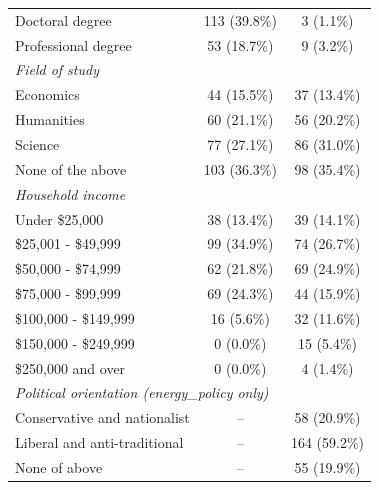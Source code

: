 \begin{table}[htbp]
\begin{tabular*}{0.75\textwidth}{@{\extracolsep{\fill}} l c c}
        \quad Doctoral degree                & 113 (39.8\%)   & 3 (1.1\%)      \\
        \quad Professional degree            & 53 (18.7\%)    & 9 (3.2\%)      \\
        \multicolumn{3}{l}{\textit{Field of study}} \\
        \quad Economics                      & 44 (15.5\%)    & 37 (13.4\%)    \\
        \quad Humanities                     & 60 (21.1\%)    & 56 (20.2\%)    \\
        \quad Science                        & 77 (27.1\%)    & 86 (31.0\%)    \\
        \quad None of the above              & 103 (36.3\%)   & 98 (35.4\%)    \\
        \multicolumn{3}{l}{\textit{Household income}} \\
        \quad Under \$25,000                 & 38 (13.4\%)    & 39 (14.1\%)    \\
        \quad \$25,001 - \$49,999            & 99 (34.9\%)    & 74 (26.7\%)    \\
        \quad \$50,000 - \$74,999            & 62 (21.8\%)    & 69 (24.9\%)    \\
        \quad \$75,000 - \$99,999            & 69 (24.3\%)    & 44 (15.9\%)    \\
        \quad \$100,000 - \$149,999          & 16 (5.6\%)     & 32 (11.6\%)    \\
        \quad \$150,000 - \$249,999          & 0 (0.0\%)      & 15 (5.4\%)     \\
        \quad \$250,000 and over             & 0 (0.0\%)      & 4 (1.4\%)      \\
        \multicolumn{3}{l}{\textit{Political orientation (energy\_policy only)}} \\
        \quad Conservative and nationalist   & --             & 58 (20.9\%)    \\
        \quad Liberal and anti-traditional   & --             & 164 (59.2\%)   \\
        \quad None of above                  & --             & 55 (19.9\%)    \\
        \hline\hline
    \end{tabular*}
\end{table}
